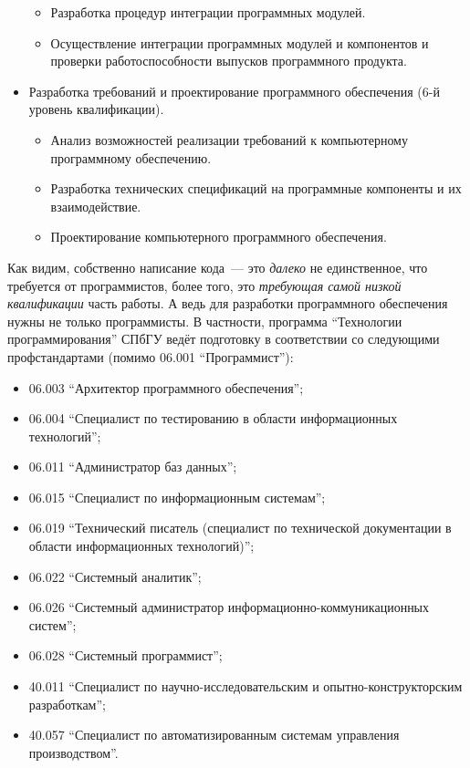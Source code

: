 \documentclass{../../text-style}
\begin{document}
\begin{itemize}
\begin{itemize}
        \item Разработка процедур интеграции программных модулей.
        \item Осуществление интеграции программных модулей и компонентов и проверки работоспособности выпусков программного продукта.
    \end{itemize}
    \item Разработка требований и проектирование программного обеспечения (6-й уровень квалификации).
    \begin{itemize}
        \item Анализ возможностей реализации требований к компьютерному программному обеспечению.
        \item Разработка технических спецификаций на программные компоненты и их взаимодействие.
        \item Проектирование компьютерного программного обеспечения.
    \end{itemize}
\end{itemize}

Как видим, собственно написание кода~--- это \emph{далеко} не единственное, что требуется от программистов, более того, это \emph{требующая самой низкой квалификации} часть работы. А ведь для разработки программного обеспечения нужны не только программисты. В частности, программа \enquote{Технологии программирования} СПбГУ ведёт подготовку в соответствии со следующими профстандартами (помимо 06.001 \enquote{Программист}): 

\begin{itemize}
    \item 06.003 \enquote{Архитектор программного обеспечения};
    \item 06.004 \enquote{Специалист по тестированию в области информационных технологий};
    \item 06.011 \enquote{Администратор баз данных};
    \item 06.015 \enquote{Специалист по информационным системам};
    \item 06.019 \enquote{Технический писатель (специалист по технической документации в области информационных технологий)};
    \item 06.022 \enquote{Системный аналитик};
    \item 06.026 \enquote{Системный администратор информационно-коммуникационных систем};
    \item 06.028 \enquote{Системный программист};
    \item 40.011 \enquote{Специалист по научно-исследовательским и опытно-конструкторским разработкам};
    \item 40.057 \enquote{Специалист по автоматизированным системам управления производством}.
\end{itemize}
\end{document}
